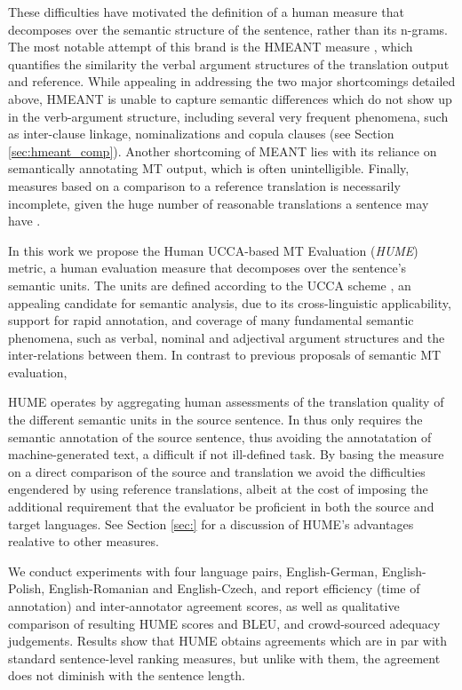 \documentclass[11pt]{article}
\newcommand{\secref}[1]{Section \ref{#1}}
\begin{document}
These difficulties have motivated the definition of a human measure that decomposes over
the semantic structure of the sentence, rather than its n-grams. The most notable attempt of
this brand is the HMEANT
measure \cite{LoWu2010,lo2011structured,LoWu2011b,LoWu2012}, which quantifies the
similarity the verbal argument structures of the translation output and reference.
While appealing in addressing the two major shortcomings
detailed above, HMEANT is unable to capture semantic differences which do not show up in
the verb-argument structure, including several very frequent phenomena, such as
inter-clause linkage, nominalizations and copula clauses (see \secref{sec:hmeant_comp}).
Another shortcoming of MEANT lies with its reliance on semantically annotating MT output,
which is often unintelligible. Finally, measures based on a comparison to a reference translation
is necessarily incomplete, given the huge number of reasonable translations
a sentence may have \cite{dryer_marcu:12}.

In this work we propose the Human UCCA-based MT Evaluation ({\it HUME}) metric,
a human evaluation measure that decomposes over the sentence's semantic units.
The units are defined according to the 
UCCA scheme \cite{abend2013universal}, an appealing candidate for semantic analysis,
due to its cross-linguistic applicability, support for rapid annotation, and coverage
of many fundamental semantic phenomena, such as verbal, nominal and adjectival
argument structures and the inter-relations between them.
In contrast to previous proposals of semantic MT evaluation, 

HUME operates by aggregating human assessments of the translation quality of the different
semantic units in the source sentence.
In thus only requires the semantic annotation of the source sentence, thus avoiding the 
annotatation of machine-generated text, a difficult if not ill-defined task.
By basing the measure on a direct comparison
of the source and translation we avoid the difficulties engendered by using
reference translations, albeit at the cost of imposing the additional requirement
that the evaluator be proficient in both the source and target languages.
See \secref{sec:} for a discussion of HUME's advantages realative to other measures.

We conduct experiments with four language pairs, English-German, English-Polish,
English-Romanian and English-Czech, and report efficiency (time of annotation) and
inter-annotator agreement scores, as well as qualitative comparison of resulting
HUME scores and BLEU, and crowd-sourced adequacy judgements. Results show that HUME obtains 
agreements which are in par with standard sentence-level ranking measures, but unlike with them,
the agreement does not diminish with the sentence length.
\end{document}
